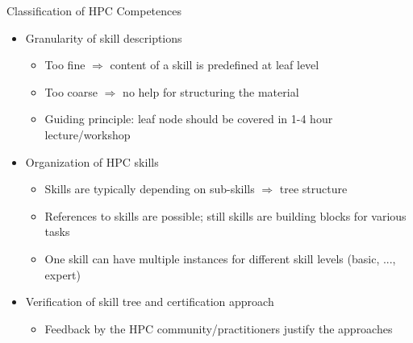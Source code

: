 \documentclass[compress,aspectratio=169]{beamer}
\begin{document}
\begin{frame}{Classification of HPC Competences}
	\begin{itemize}
		\item Granularity of skill descriptions
		\begin{itemize}
			\item Too fine $\Rightarrow$ content of a skill is predefined at leaf level
			\item Too coarse $\Rightarrow$ no help for structuring the material
			\item Guiding principle: leaf node should be covered in 1-4 hour lecture/workshop
		\end{itemize}


    \item Organization of HPC skills
    \begin{itemize}
      \item Skills are typically depending on sub-skills $\Rightarrow$ tree structure
      \item References to skills are possible; still skills are building blocks for various tasks
      \item One skill can have multiple instances for different skill levels (basic, ..., expert)
    \end{itemize}


    \item Verification of skill tree and certification approach
      \begin{itemize}
        \item Feedback by the HPC community/practitioners justify the approaches
      \end{itemize}
	\end{itemize}
\end{frame}
\end{document}

